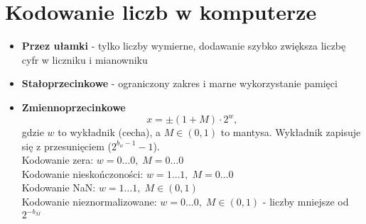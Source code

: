 \section{Kodowanie liczb w komputerze}
\begin{itemize}
	\item \textbf{Przez ułamki} - tylko liczby wymierne, dodawanie szybko zwiększa liczbę cyfr w liczniku i mianowniku
	\item \textbf{Stałoprzecinkowe} - ograniczony zakres i marne wykorzystanie pamięci
	\item \textbf{Zmiennoprzecinkowe}
	      \[
		      x = \pm (1+M) \cdot 2^w,
	      \]
	      gdzie \( w \) to wykładnik (cecha), a \( M \in (0, 1) \) to mantysa. Wykładnik zapisuje się z przesunięciem (\( 2^{b_w-1} - 1 \)). \\
	      Kodowanie zera: \;\quad\quad\quad\quad\quad\quad\( w = 0\dots0, \;M=0\dots0 \) \\
	      Kodowanie nieskończoności: \;\quad\( w = 1\dots1, \;M=0\dots0 \) \\
	      Kodowanie NaN: \;\quad\quad\quad\quad\quad\;\;\;\( w = 1\dots1, \;M \in (0, 1) \) \\
	      Kodowanie nieznormalizowane: \( w = 0\dots0, \;M \in (0, 1) \) - liczby mniejsze od \( 2^{-b_M} \)
\end{itemize}
